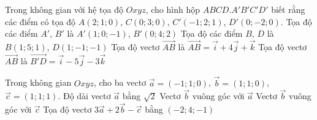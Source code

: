 \begin{ex}%
	Trong không gian với hệ tọa độ $Oxyz$, cho  hình hộp $ABCD.A'B'C'D'$ biết rằng các điểm có tọa độ $A(2;1;0)$, $C(0;3;0)$, $C'(-1;2;1)$, $D'(0;-2;0)$.
	\choiceTF 
		{Tọa độ các điểm $A'$, $B'$ là $A'(1;0;-1)$,  $B'(0;4;2)$}
		{\True Tọa độ các  điểm $B$, $D$ là $B(1;5;1)$, $D(1;-1;-1)$}
		{\True Tọa  độ vectơ $\overrightarrow{AB}$ là $\overrightarrow{AB}=\overrightarrow{i}+4\overrightarrow{j}+\overrightarrow{k}$}
		{\True Tọa độ vectơ $\overrightarrow{AB}$  là $\overrightarrow{B'D}=\overrightarrow{i}-5\overrightarrow{j}-3\overrightarrow{k}$}
\end{ex}

\begin{ex}%
	Trong không  gian $Oxyz$, cho ba vectơ $\overrightarrow{a}=(-1;1;0)$, $\overrightarrow{b}=(1;1;0)$, $\overrightarrow{c}=(1;1;1)$.
	\choiceTF 
		{\True  Độ dài vectơ $\overrightarrow{a}$ bằng $\sqrt{2}$}
		{\True  Vectơ $\overrightarrow{b}$ vuông góc với $\overrightarrow{a}$}
		 {Vectơ $\overrightarrow{b}$ vuông góc với $\overrightarrow{c}$}
		{\True Tọa độ vectơ $3\overrightarrow{a}+2\overrightarrow{b}-\overrightarrow{c}$ bằng $(-2;4;-1)$} 
\end{ex}

